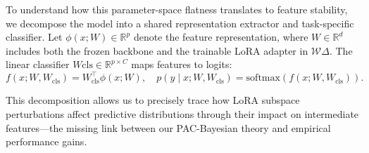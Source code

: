 \documentclass{article} %
\begin{document}
 To understand how this parameter-space flatness translates to feature stability, we decompose the model into a shared representation extractor and task-specific classifier. Let $\phi(x;W) \in \mathbb{R}^p$ denote the feature representation, where $W \in \mathbb{R}^d$ includes both the frozen backbone and the trainable LoRA adapter in $\mathcal{W}\Delta$. The linear classifier $W{\text{cls}} \in \mathbb{R}^{p \times C}$ maps features to logits:
 \[
 f(x;W,W_{\mathrm{cls}}) = W_{\mathrm{cls}}^\top \phi(x;W),
 \quad
 p(y\mid x;W,W_{\mathrm{cls}})=\mathrm{softmax}(f(x;W,W_{\mathrm{cls}})).
 \]


This decomposition allows us to precisely trace how LoRA subspace perturbations affect predictive distributions through their impact on intermediate features—the missing link between our PAC-Bayesian theory and empirical performance gains.



 

 




\end{document}
